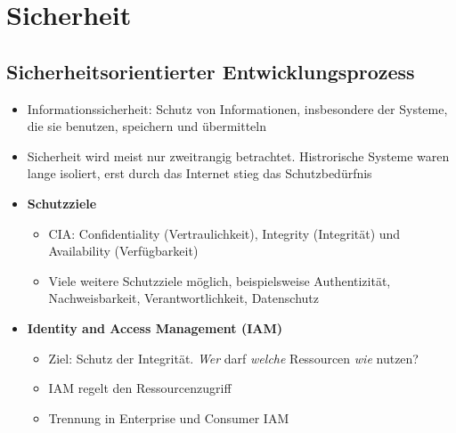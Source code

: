 \section{Sicherheit}

\subsection{Sicherheitsorientierter Entwicklungsprozess}
\begin{itemize}
	\item Informationssicherheit: Schutz von Informationen, insbesondere der Systeme, die sie benutzen, speichern und übermitteln
	\item Sicherheit wird meist nur zweitrangig betrachtet. Histrorische Systeme waren lange isoliert, erst durch das Internet stieg das Schutzbedürfnis
	\item \textbf{Schutzziele}
	\begin{itemize}
		\item CIA: Confidentiality (Vertraulichkeit), Integrity (Integrität) und Availability (Verfügbarkeit)
		\item Viele weitere Schutzziele möglich, beispielsweise Authentizität, Nachweisbarkeit, Verantwortlichkeit, Datenschutz
	\end{itemize}
	\item \textbf{Identity and Access Management (IAM)}
	\begin{itemize}
		\item Ziel: Schutz der Integrität. \textit{Wer} darf \textit{welche} Ressourcen \textit{wie} nutzen?
		\item IAM regelt den Ressourcenzugriff
		\item Trennung in Enterprise und Consumer IAM
	\end{itemize}
\end{itemize}


